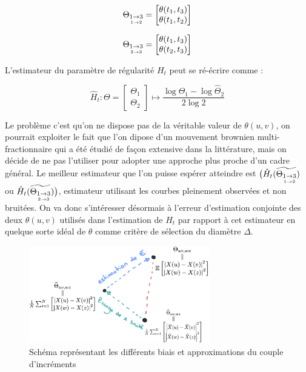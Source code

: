 \begin{minipage}{0.5\textwidth}
	\begin{equation*}
		\Theta_{\underset{1 \rightarrow 2}{1 \rightarrow 3}} = \begin{bmatrix} \theta(t_1, t_3) \\ \theta(t_1, t_2) \end{bmatrix}
	\end{equation*}
\end{minipage}
\hfill
\begin{minipage}{0.5\textwidth}
	\begin{equation*}
		\Theta_{\underset{2 \rightarrow 3}{1 \rightarrow 3}} = \begin{bmatrix} \theta(t_1, t_3) \\ \theta(t_2, t_3) \end{bmatrix}
	\end{equation*}
\end{minipage}

\smallskip

L'estimateur du paramètre de régularité $H_t$ peut se ré-écrire comme :

\smallskip


\begin{equation*}
	\widehat H_t : \Theta = \begin{bmatrix} \Theta_1 \\ \Theta_2 \end{bmatrix} \longmapsto \frac{ \log \widehat \Theta_1 - \log \widehat \Theta_2 }{2 \log 2}
\end{equation*}

\smallskip

Le problème c'est qu'on ne dispose pas de la véritable valeur de $\theta(u,v)$, on pourrait exploiter le fait que l'on dipose d'un mouvement brownien multi-fractionnaire qui a été étudié de façon extensive dans la littérature, mais on décide de ne pas l'utiliser pour adopter une approche plus proche d'un cadre général. 
Le meilleur estimateur que l'on puisse espérer atteindre est $\bigl(\hat H_t( \widetilde {\Theta_{\underset{1 \rightarrow 2}{1 \rightarrow 3}}})$ ou $\hat H_t( \widetilde {\Theta_{\underset{2 \rightarrow 3}{1 \rightarrow 3}}})\bigr)$, estimateur utilisant les courbes pleinement observées et non bruitées. On va donc s'intéresser désormais à l'erreur d'estimation conjointe des deux $\theta(u,v)$ utilisés dans l'estimation de $H_t$ par rapport à cet estimateur en quelque sorte \og idéal \fg de $\theta$ comme critère de sélection du diamètre $\Delta$.

\begin{figure}[H]
	\centering
	\includegraphics[width=0.7\textwidth]{Images/sketches/theta_biais.png}
	\caption{Schéma représentant les différents biais et approximations du couple d'incréments}
	\label{fig:sketch_theta_biais}
\end{figure}


